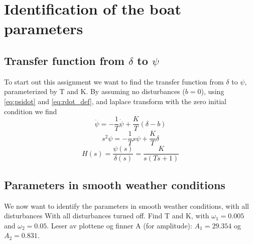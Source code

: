 
\section{Identification of the boat parameters} \label{sec:part1}

\subsection{Transfer function from $\delta$ to $\psi$}
To start out this assignment we want to find the transfer function from $\delta$ to $\psi$, parameterized by T and K. By assuming no disturbances ($b=0$), using \cref{eq:psidot} and \cref{eq:rdot_def}, and laplace transform with the zero initial condition we find
\begin{equation*}
    \ddot{\psi} = -\frac{1}{T}\dot{\psi} + \frac{K}{T}(\delta - b)
\end{equation*}
\begin{equation*}
    s^2\psi = -\frac{1}{T}s\psi + \frac{K}{T}\delta
\end{equation*}
\begin{equation} 
    H(s) =  \frac{\psi(s)}{\delta(s)} = \frac{K}{s(Ts+1)}
\end{equation}

\subsection{Parameters in smooth weather conditions}

We now want to identify the parameters in smooth weather conditions, with all disturbances 
With all disturbances turned off. Find T and K, with $\omega_1 = 0.005$ and $\omega_2 = 0.05$. Leser av plottene og finner A (for amplitude): $A_1 = 29.354$ og $A_2 = 0.831$. 

